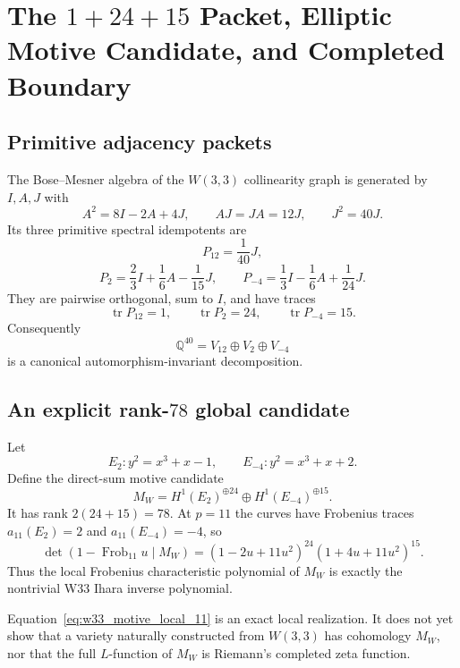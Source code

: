 
\section{The $1+24+15$ Packet, Elliptic Motive Candidate, and Completed Boundary}
\label{sec:casey_w33_motive_global}

\subsection{Primitive adjacency packets}

The Bose--Mesner algebra of the $W(3,3)$ collinearity graph is generated by
$I,A,J$ with
\[
 A^2=8I-2A+4J,\qquad AJ=JA=12J,\qquad J^2=40J.
\]
Its three primitive spectral idempotents are
\[
 P_{12}=\frac1{40}J,
\]
\[
 P_2=\frac23 I+\frac16 A-\frac1{15}J,
 \qquad
 P_{-4}=\frac13 I-\frac16 A+\frac1{24}J.
\]
They are pairwise orthogonal, sum to $I$, and have traces
\[
 \operatorname{tr}P_{12}=1,
 \qquad
 \operatorname{tr}P_2=24,
 \qquad
 \operatorname{tr}P_{-4}=15.
\]
Consequently
\[
 \mathbb Q^{40}=V_{12}\oplus V_2\oplus V_{-4}
\]
is a canonical automorphism-invariant decomposition.

\subsection{An explicit rank-$78$ global candidate}

Let
\[
 E_2:y^2=x^3+x-1,
 \qquad
 E_{-4}:y^2=x^3+x+2.
\]
Define the direct-sum motive candidate
\[
 M_W=H^1(E_2)^{\oplus24}\oplus H^1(E_{-4})^{\oplus15}.
\]
It has rank $2(24+15)=78$. At $p=11$ the curves have Frobenius traces
$a_{11}(E_2)=2$ and $a_{11}(E_{-4})=-4$, so
\begin{equation}
 \det(1-\operatorname{Frob}_{11}u\mid M_W)
 =(1-2u+11u^2)^{24}(1+4u+11u^2)^{15}.
 \label{eq:w33_motive_local_11}
\end{equation}
Thus the local Frobenius characteristic polynomial of $M_W$ is exactly the
nontrivial W33 Ihara inverse polynomial.

\begin{remark}
Equation~\eqref{eq:w33_motive_local_11} is an exact local realization. It does
not yet show that a variety naturally constructed from $W(3,3)$ has
cohomology $M_W$, nor that the full $L$-function of $M_W$ is Riemann's
completed zeta function.
\end{remark}

